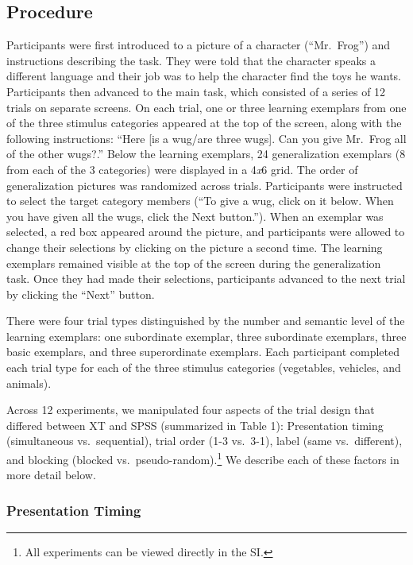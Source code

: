 \documentclass[english,floatsintext,man]{apa6}
\theoremstyle{definition}
\theoremstyle{definition}
\theoremstyle{remark}
\begin{document}
\subsection{Procedure}\label{procedure}

Participants were first introduced to a picture of a character
(\enquote{Mr.~Frog}) and instructions describing the task. They were
told that the character speaks a different language and their job was to
help the character find the toys he wants. Participants then advanced to
the main task, which consisted of a series of 12 trials on separate
screens. On each trial, one or three learning exemplars from one of the
three stimulus categories appeared at the top of the screen, along with
the following instructions: \enquote{Here {[}is a wug/are three wugs{]}.
Can you give Mr.~Frog all of the other wugs?.} Below the learning
exemplars, 24 generalization exemplars (8 from each of the 3 categories)
were displayed in a 4\emph{x}6 grid. The order of generalization
pictures was randomized across trials. Participants were instructed to
select the target category members (\enquote{To give a wug, click on it
below. When you have given all the wugs, click the Next button.}). When
an exemplar was selected, a red box appeared around the picture, and
participants were allowed to change their selections by clicking on the
picture a second time. The learning exemplars remained visible at the
top of the screen during the generalization task. Once they had made
their selections, participants advanced to the next trial by clicking
the \enquote{Next} button.

There were four trial types distinguished by the number and semantic
level of the learning exemplars: one subordinate exemplar, three
subordinate exemplars, three basic exemplars, and three superordinate
exemplars. Each participant completed each trial type for each of the
three stimulus categories (vegetables, vehicles, and animals).

Across 12 experiments, we manipulated four aspects of the trial design
that differed between XT and SPSS (summarized in Table 1): Presentation
timing (simultaneous vs.~sequential), trial order (1-3 vs.~3-1), label
(same vs.~different), and blocking (blocked
vs.~pseudo-random).\footnote{All experiments can be viewed directly in the SI.}
We describe each of these factors in more detail below.

\subsubsection{Presentation Timing}\label{presentation-timing}
\end{document}
